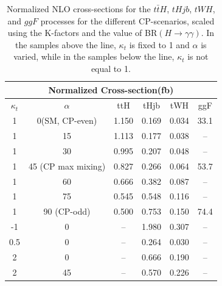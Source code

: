 \begin{table}
  \centering
  \begin{tabular}{|c|c||c|c|c|c|}
    \hline
    \multicolumn{6}{|c|}{Normalized Cross-section(fb)} \\
    \hline \hline
    $\kappa_t$ & $\alpha$ & ttH & tHjb & tWH & ggF\\
    \hline
    1 & 0(SM, CP-even)  & 1.150 & 0.169 & 0.034 & 33.1 \\
    1 & 15              & 1.113 & 0.177 & 0.038 & -- \\
    1 & 30              & 0.995 & 0.207 & 0.048 & -- \\
    1 & 45 (CP max mixing)      & 0.827 & 0.266 & 0.064 & 53.7 \\
    1 & 60              & 0.666 & 0.382 & 0.087 & -- \\
    1 & 75              & 0.545 & 0.548 & 0.116 & -- \\
    1 & 90 (CP-odd)     & 0.500 & 0.753 & 0.150 & 74.4 \\
    \hline \hline
    -1 & 0    & -- & 1.980 & 0.307 & -- \\
    0.5 & 0   & -- & 0.264 & 0.030 & -- \\
    2 & 0     & -- & 0.666 & 0.190 & -- \\
    2 & 45    & -- & 0.570 & 0.226 & -- \\
    \hline
  \end{tabular}
  \caption{Normalized NLO cross-sections for the $t\bar{t}H$, $tHjb$, $tWH$, and $ggF$ processes for the different CP-scenarios, scaled using the K-factors and the value of BR$(H\rightarrow\gamma\gamma)$. In the samples above the line, $\kappa_{t}$ is fixed to 1 and $\alpha$ is varied, while in the samples below the line, $\kappa_{t}$ is not equal to 1.}
  \label{tab:MCsamples_XS_norm}
\end{table}
